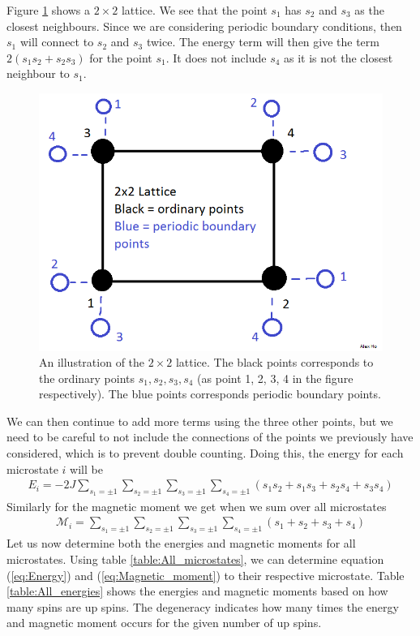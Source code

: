 \documentclass[12pt]{article}
\begin{document}
Figure \ref{fig:Lattice_illustration} shows a $2\times2$ lattice. We see that the point $s_1$ has $s_2$ and $s_3$ as the closest neighbours. Since we are considering periodic boundary conditions, then $s_1$ will connect to $s_2$ and $s_3$ twice. The energy term will then give the term $2(s_1s_2 + s_2s_3)$ for the point $s_1$. It does not include $s_4$ as it is not the closest neighbour to $s_1$. 
\begin{figure}[!h]
\centering
\includegraphics[width=\linewidth]{2x2_lattice_illustration.png}
\caption{An illustration of the $2\times 2$ lattice. The black points corresponds to the ordinary points $s_1, s_2, s_3, s_4$ (as point 1, 2, 3, 4 in the figure respectively). The blue points corresponds periodic boundary points.}
\label{fig:Lattice_illustration}
\end{figure}

We can then continue to add more terms using the three other points, but we need to be careful to not include the connections of the points we previously have considered, which is to prevent double counting. Doing this, the energy for each microstate $i$ will be
\begin{align}
E_i = -2J\displaystyle \sum_{s_1 = \pm1} \sum_{s_2 = \pm1} \sum_{s_3 = \pm1} \sum_{s_4 = \pm1}(s_1s_2 + s_1s_3 + s_2s_4 + s_3s_4)
\label{eq:Energy}
\end{align}
Similarly for the magnetic moment we get when we sum over all microstates 
\begin{align}
\mathcal{M}_i = \displaystyle \sum_{s_1 = \pm1} \sum_{s_2 = \pm1} \sum_{s_3 = \pm1} \sum_{s_4 = \pm1} (s_1 + s_2 + s_3 + s_4)
\label{eq:Magnetic_moment}
\end{align}
Let us now determine both the energies and magnetic moments for all microstates. Using table \ref{table:All_microstates}, we can determine equation (\ref{eq:Energy}) and (\ref{eq:Magnetic_moment}) to their respective microstate. Table \ref{table:All_energies} shows the energies and magnetic moments based on how many spins are up spins. The degeneracy indicates how many times the energy and magnetic moment occurs for the given number of up spins.
\end{document}
